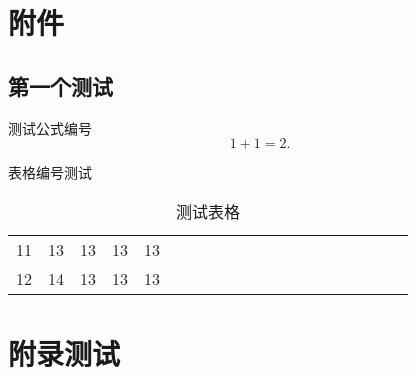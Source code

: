 \documentclass[forprint]{plainAssign}
\begin{document}


\appendix

\chapter{附件}

\section{第一个测试}
测试公式编号
\begin{equation}
1+1=2.
\end{equation}

表格编号测试

\begin{table}[h]
  \centering
  \caption{测试表格}
  \begin{tabular}{*{20}c}
     \hline
     11 & 13  & 13  & 13  & 13 \\
     12 & 14  & 13  & 13  & 13 \\
     \hline
   \end{tabular}
\end{table}


\chapter{附录测试}




\cleardoublepage
\end{document}
